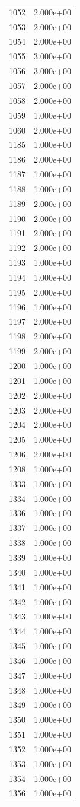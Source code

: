 \documentclass[12pt]{article}
\begin{document}
\begin{longtable}{@{}cc@{}}
1052 & 2.000e+00 \\
1053 & 2.000e+00 \\
1054 & 2.000e+00 \\
1055 & 3.000e+00 \\
1056 & 3.000e+00 \\
1057 & 2.000e+00 \\
1058 & 2.000e+00 \\
1059 & 1.000e+00 \\
1060 & 2.000e+00 \\
1185 & 1.000e+00 \\
1186 & 2.000e+00 \\
1187 & 1.000e+00 \\
1188 & 1.000e+00 \\
1189 & 2.000e+00 \\
1190 & 2.000e+00 \\
1191 & 2.000e+00 \\
1192 & 2.000e+00 \\
1193 & 1.000e+00 \\
1194 & 1.000e+00 \\
1195 & 2.000e+00 \\
1196 & 1.000e+00 \\
1197 & 2.000e+00 \\
1198 & 2.000e+00 \\
1199 & 2.000e+00 \\
1200 & 1.000e+00 \\
1201 & 1.000e+00 \\
1202 & 2.000e+00 \\
1203 & 2.000e+00 \\
1204 & 2.000e+00 \\
1205 & 1.000e+00 \\
1206 & 2.000e+00 \\
1208 & 1.000e+00 \\
1333 & 1.000e+00 \\
1334 & 1.000e+00 \\
1336 & 1.000e+00 \\
1337 & 1.000e+00 \\
1338 & 1.000e+00 \\
1339 & 1.000e+00 \\
1340 & 1.000e+00 \\
1341 & 1.000e+00 \\
1342 & 1.000e+00 \\
1343 & 1.000e+00 \\
1344 & 1.000e+00 \\
1345 & 1.000e+00 \\
1346 & 1.000e+00 \\
1347 & 1.000e+00 \\
1348 & 1.000e+00 \\
1349 & 1.000e+00 \\
1350 & 1.000e+00 \\
1351 & 1.000e+00 \\
1352 & 1.000e+00 \\
1353 & 1.000e+00 \\
1354 & 1.000e+00 \\
1356 & 1.000e+00 \\

\bottomrule
\end{longtable}
\end{document}
